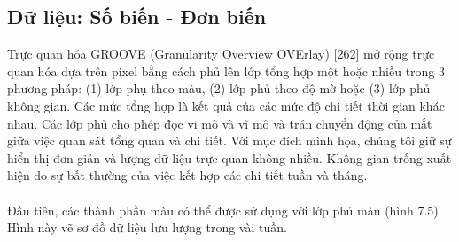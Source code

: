 \subsection{Dữ liệu: Số biến - Đơn biến}
Trực quan hóa GROOVE (Granularity Overview OVErlay) [262] mở rộng trực quan hóa dựa trên pixel bằng cách phủ lên lớp tổng hợp một hoặc nhiều trong 3 phương pháp: (1) lớp phụ theo màu, (2) lớp phủ theo độ mờ hoặc (3) lớp phủ không gian. Các mức tổng hợp là kết quả của các mức độ chi tiết thời gian khác nhau. Các lớp phủ cho phép đọc vi mô và vĩ mô và trán chuyển động của mắt giữa việc quan sát tổng quan và chi tiết. Với mục đích mình họa, chúng tôi giữ sự hiển thị đơn giản và lượng dữ liệu trực quan không nhiều. Không gian trống xuất hiện do sự bất thường của việc kết hợp các chi tiết tuần và tháng. 
\\ \\
Đầu tiên, các thành phần màu có thể được sử dụng với lớp phủ màu (hình 7.5). Hình này vẽ sơ đồ dữ liệu lưu lượng trong vài tuần. 